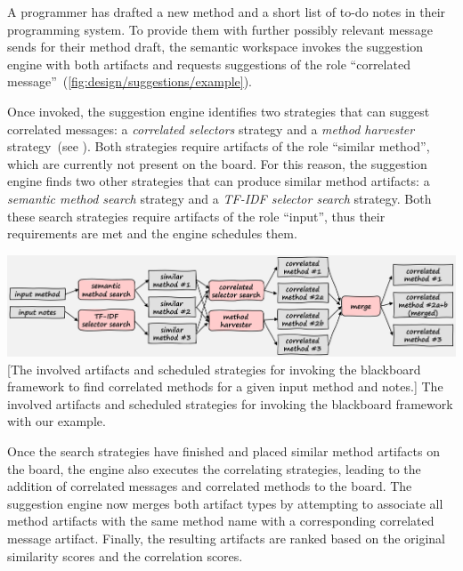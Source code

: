 \begin{example}
	A programmer has drafted a new method and a short list of to-do notes in their programming system.
	To provide them with further possibly relevant message sends for their method draft, the semantic workspace invokes the suggestion engine with both artifacts and requests suggestions of the role ``correlated message''~(\cref{fig:design/suggestions/example}).

	Once invoked, the suggestion engine identifies two strategies that can suggest correlated messages: a \emph{correlated selectors} strategy and a \emph{method harvester} strategy~(see ).
	Both strategies require artifacts of the role ``similar method'', which are currently not present on the board.
	For this reason, the suggestion engine finds two other strategies that can produce similar method artifacts: a \emph{semantic method search} strategy and a \emph{TF-IDF selector search} strategy.
	Both these search strategies require artifacts of the role ``input'', thus their requirements are met and the engine schedules them.

	\vspace{\baselineskip}
	\begin{center}
		\includegraphics[width=\textwidth]{02_suggestions/example.png}
		[The involved artifacts and scheduled strategies for invoking the blackboard framework to find correlated methods for a given input method and notes.]{
			The involved artifacts and scheduled strategies for invoking the blackboard framework with our example.
		}
		\label{fig:design/suggestions/example}
	\end{center}

	Once the search strategies have finished and placed similar method artifacts on the board, the engine also executes the correlating strategies, leading to the addition of correlated messages and correlated methods to the board.
	The suggestion engine now merges both artifact types by attempting to associate all method artifacts with the same method name with a corresponding correlated message artifact.
	Finally, the resulting artifacts are ranked based on the original similarity scores and the correlation scores.
\end{example}

